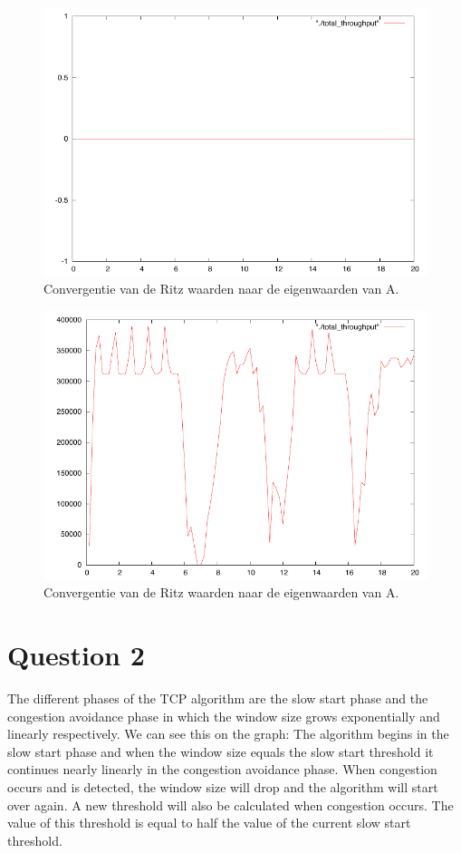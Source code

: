 \documentclass[a4paper]{report}
\newcommand{\opgave}[1]{\section{Question #1}}
\begin{document}
\begin{figure}[htb]
\centerline{\includegraphics{Exercise2/Question2_1.pdf}}
\caption{Convergentie van de Ritz waarden naar de eigenwaarden van A.}
\label{fig:figure4}
\end{figure}

\begin{figure}[htb]
\centerline{\includegraphics{Exercise2/Question2_1node2.pdf}}
\caption{Convergentie van de Ritz waarden naar de eigenwaarden van A.}
\label{fig:figure5}
\end{figure}

\opgave{2}
The different phases of the TCP algorithm are the slow start phase and the congestion avoidance phase in which the window size grows exponentially and linearly respectively. We can see this on the graph: The algorithm begins in the slow start phase and when the window size equals the slow start threshold it continues nearly linearly in the congestion avoidance phase. When congestion occurs and is detected, the window size will drop and the algorithm will start over again. A new threshold will also be calculated when congestion occurs. The value of this threshold is equal to half the value of the current slow start threshold. 
\end{document}
